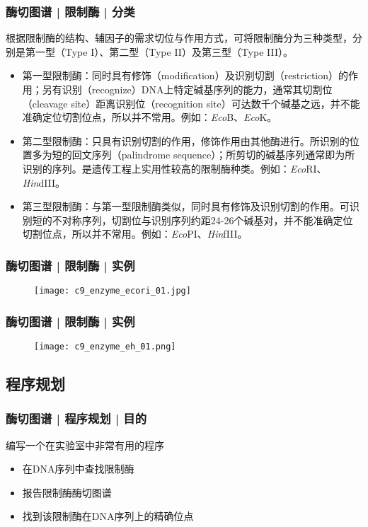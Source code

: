 \begin{frame}
  \frametitle{酶切图谱 | 限制酶 | 分类}
  根据限制酶的结构、辅因子的需求切位与作用方式，可将限制酶分为三种类型，分别是第一型（Type I）、第二型（Type II）及第三型（Type III）。
  \begin{itemize}
    \item 第一型限制酶：同时具有修饰（modification）及识别切割（restriction）的作用；另有识别（recognize）DNA上特定碱基序列的能力，通常其切割位（cleavage site）距离识别位（recognition site）可达数千个碱基之远，并不能准确定位切割位点，所以并不常用。例如：\textit{Eco}B、\textit{Eco}K。
    \item 第二型限制酶：只具有识别切割的作用，修饰作用由其他酶进行。所识别的位置多为短的\alert{回文序列（palindrome sequence）}；所剪切的碱基序列通常即为所识别的序列。是遗传工程上实用性较高的限制酶种类。例如：\textit{Eco}RI、\textit{Hin}dIII。
    \item 第三型限制酶：与第一型限制酶类似，同时具有修饰及识别切割的作用。可识别短的不对称序列，切割位与识别序列约距24-26个碱基对，并不能准确定位切割位点，所以并不常用。例如：\textit{Eco}PI、\textit{Hin}fIII。
  \end{itemize}
\end{frame}

\begin{frame}
  \frametitle{酶切图谱 | 限制酶 | 实例}
  \begin{figure}
    \centering
    \texttt{[image: c9\_enzyme\_ecori\_01.jpg]}
  \end{figure}
\end{frame}

\begin{frame}
  \frametitle{酶切图谱 | 限制酶 | 实例}
  \begin{figure}
    \centering
    \texttt{[image: c9\_enzyme\_eh\_01.png]}
  \end{figure}
\end{frame}

\subsection{程序规划}
\begin{frame}
  \frametitle{酶切图谱 | 程序规划 | 目的}
  \begin{block}{编写一个在实验室中非常有用的程序}
    \begin{itemize}
      \item 在DNA序列中查找限制酶
      \item 报告限制酶酶切图谱
      \item 找到该限制酶在DNA序列上的精确位点
    \end{itemize}
  \end{block}
\end{frame}

